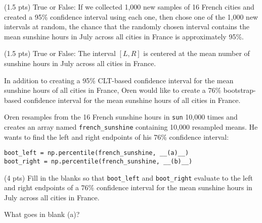 \begin{prob}[(17 pts)]
\begin{subprobset}
\begin{subprob}

\end{subprob}

\begin{subprob}(1.5 pts) True or False: If we collected 1,000 new samples of 16 French cities and created a 95\% confidence interval using each one, then chose one of the 1,000 new intervals at random, the chance that the randomly chosen interval contains the mean sunshine hours in July across all cities in France is approximately 95\%.


\end{subprob}

\begin{subprob}(1.5 pts) True or False: The interval $[L, R]$ is centered at the mean number of sunshine hours in July across all cities in France.


\end{subprob}

\end{subprobset}

\newpage

In addition to creating a 95\% CLT-based confidence interval for the mean sunshine hours of all cities in France, Oren would like to create a 76\% bootstrap-based confidence interval for the mean sunshine hours of all cities in France.

Oren resamples from the 16 French sunshine hours in \texttt{sun} 10,000 times and creates an array named \texttt{french\_sunshine} containing 10,000 resampled means. He wants to find the left and right endpoints of his 76\% confidence interval:

\begin{verbatim}
boot_left = np.percentile(french_sunshine, __(a)__)
boot_right = np.percentile(french_sunshine, __(b)__)
\end{verbatim}

\begin{subprobset}

\begin{subprob}(4 pts) Fill in the blanks so that \texttt{boot\_left} and \texttt{boot\_right} evaluate to the left and right endpoints of a 76\% confidence interval for the mean sunshine hours in July across all cities in France.

\begin{minipage}[t]{0.4\textwidth}
What goes in blank (a)?


\end{minipage}
\end{subprob}
\end{subprobset}
\end{prob}
